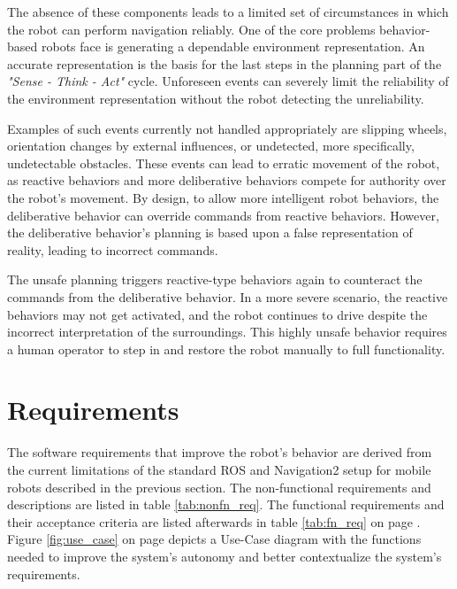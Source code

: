 The absence of these components leads to a limited set of circumstances in which the robot can perform navigation reliably. One of the core problems behavior-based robots face is generating a dependable environment representation. An accurate representation is the basis for the last steps in the planning part of the \textit{"Sense - Think - Act"} cycle. Unforeseen events can severely limit the reliability of the environment representation without the robot detecting the unreliability. 

Examples of such events currently not handled appropriately are slipping wheels, orientation changes by external influences, or undetected, more specifically, undetectable obstacles. These events can lead to erratic movement of the robot, as reactive behaviors and more deliberative behaviors compete for authority over the robot's movement. By design, to allow more intelligent robot behaviors, the deliberative behavior can override commands from reactive behaviors. However, the deliberative behavior's planning is based upon a false representation of reality, leading to incorrect commands. 

The unsafe planning triggers reactive-type behaviors again to counteract the commands from the deliberative behavior. In a more severe scenario, the reactive behaviors may not get activated, and the robot continues to drive despite the incorrect interpretation of the surroundings. This highly unsafe behavior requires a human operator to step in and restore the robot manually to full functionality. 

\section{Requirements}
\label{sec:Requirements}

The software requirements that improve the robot's behavior are derived from the current limitations of the standard ROS and Navigation2 setup for mobile robots described in the previous section. The non-functional requirements and descriptions are listed in table \ref{tab:nonfn_req}. The functional requirements and their acceptance criteria are listed afterwards in table \ref{tab:fn_req} on page \pageref{tab:fn_req}. Figure \ref{fig:use_case} on page \pageref{fig:use_case} depicts a Use-Case diagram with the functions needed to improve the system's autonomy and better contextualize the system's requirements.


